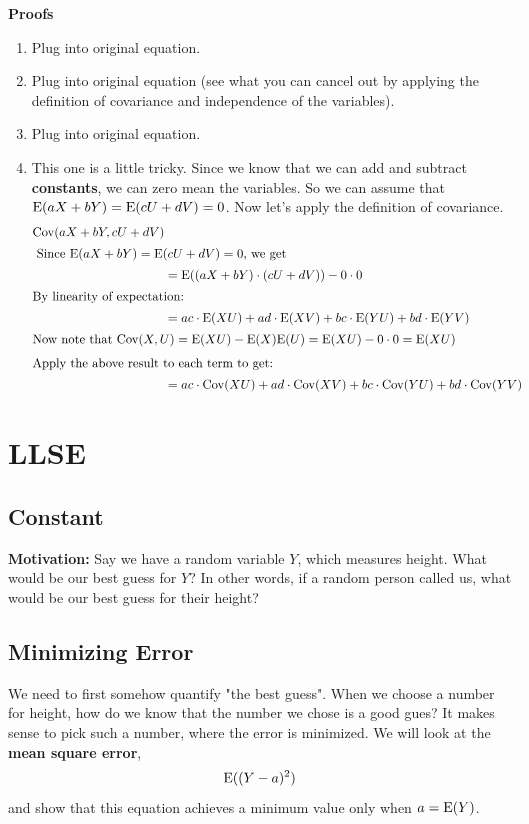 \documentclass{exam}
\begin{document}
\textbf{Proofs}
\begin{enumerate}
\item Plug into original equation.
\item Plug into original equation (see what you can cancel out by applying the definition of covariance and independence of the variables).
\item Plug into original equation. 
\item This one is a little tricky. Since we know that we can add and subtract \textbf{constants}, we can zero mean the variables. So we can assume that $\text{E}(aX + bY) = \text{E}(cU + dV) = 0$. Now let's apply the definition of covariance.
\begin{align*}
\text{Cov}(aX + bY, cU + dV) \\
\intertext{ Since $\text{E}(aX + bY) = \text{E}(cU + dV) = 0$, we get}
&= \text{E}((aX + bY) \cdot (cU + dV)) - 0 \cdot 0 \\
\intertext{By linearity of expectation:}
&= ac \cdot \text{E}(XU) + ad \cdot \text{E}(XV)  + bc \cdot \text{E}(YU) + bd \cdot \text{E}(YV) \\
\intertext{Now note that $\text{Cov}(X, U) = \text{E}(XU) - \text{E}(X)\text{E}(U) = \text{E}(XU) - 0\cdot 0 = \text{E}(XU)$}
\intertext{Apply the above result to each term to get:}
&= ac \cdot \text{Cov}(XU) + ad \cdot \text{Cov}(XV)  + bc \cdot \text{Cov}(YU) + bd \cdot \text{Cov}(YV)
\end{align*}
\end{enumerate}

\clearpage 

\section{LLSE}
\subsection{Constant}
\textbf{Motivation: } Say we have a random variable $Y$, which measures height. What would be our best guess for $Y$? In other words, if a random person called us, what would be our best guess for their height?

\subsection{Minimizing Error}
We need to first somehow quantify "the best guess".  When we choose a number for height, how do we know that the number we chose is a good gues? It makes sense to pick such a number, where the error is minimized. We will look at the \textbf{mean square error},
\[\text{E}((Y - a)^2)\]
and show that this equation achieves a minimum value only when $a = \text{E}(Y)$.
\end{document}
